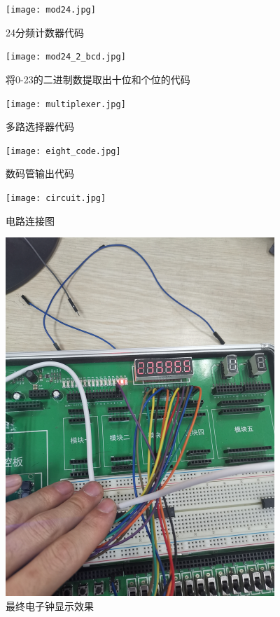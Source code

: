 \documentclass{article}
\begin{document}
\begin{spacing}{1.5}
    \begin{figure}[H]
        \centering
        \texttt{[image: mod24.jpg]}
        \caption{24分频计数器代码}
    \end{figure}

    \begin{figure}[H]
        \centering
        \texttt{[image: mod24\_2\_bcd.jpg]}
        \caption{将0-23的二进制数提取出十位和个位的代码}
    \end{figure}
    
    \begin{figure}[H]
        \centering
        \texttt{[image: multiplexer.jpg]}
        \caption{多路选择器代码}
    \end{figure}

    \begin{figure}[H]
        \centering
        \texttt{[image: eight\_code.jpg]}
        \caption{数码管输出代码}
    \end{figure}

    \begin{figure}
        \centering
        \texttt{[image: circuit.jpg]}
        \caption{电路连接图}
    \end{figure}

    \begin{figure}[H]
        \centering
        \includegraphics[width=4in]{final_result.jpg}
        \caption{最终电子钟显示效果}
    \end{figure}
\end{spacing}
\end{document}
